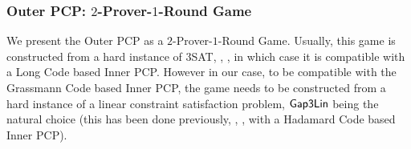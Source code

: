 \documentclass{toc}
\begin{document}
%
\subsubsection{Outer PCP: \texorpdfstring{$2$-Prover-$1$-Round}{2-Prover-1-Round} Game}

We present the Outer PCP as a $2$-Prover-$1$-Round Game. Usually, this game is constructed from a hard instance of 3SAT, \eg, \cite{Has01, Has99},
in which case it is compatible with a Long Code based Inner PCP.
%
However in our case, to be compatible with the Grassmann Code
%
 based Inner PCP, the game needs to be constructed from a hard instance
 of a linear constraint satisfaction problem,
${\sf Gap3Lin}$ being the natural choice (this has been done previously, \eg,
\cite{KhotClique,KS}, with a Hadamard Code
%
based Inner PCP).
\end{document}
